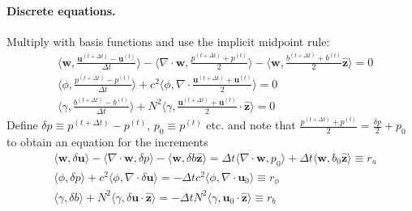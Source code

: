 \documentclass[10pt]{article}
\renewcommand{\vec}[1]{\boldsymbol{#1}}
\newcommand{\zhat}{\hat{\vec{z}}}
\newcommand{\ddtdisc}[1]{\frac{{#1}^{(t+\Delta t)}-{#1}^{(t)}}{\Delta t}}
\newcommand{\tavg}[1]{\frac{{#1}^{(t+\Delta t)}+{#1}^{(t)}}{2}}
\begin{document}
\paragraph{Discrete equations.}
Multiply with basis functions and use the implicit midpoint rule:
\begin{equation}
 \begin{aligned}
  &\langle\vec{w},\ddtdisc{\vec{u}}\rangle
  - \langle\nabla\cdot\vec{w},\tavg{p}\rangle
  - \langle\vec{w},\tavg{b}\zhat\rangle = 0\\[1ex]
  &\langle\phi,\ddtdisc{p}\rangle
  +c^2 \langle\phi,\nabla\cdot\tavg{\vec{u}}\rangle
  = 0\\[1ex]
  &\langle\gamma,\ddtdisc{b}\rangle
  + N^2\langle\gamma,\tavg{\vec{u}}\cdot\zhat\rangle
  = 0
 \end{aligned}
\end{equation}
Define $\delta p\equiv p^{(t+\Delta t)}-p^{(t)}$, $p_0\equiv p^{(t)}$ etc. and note that $\tavg{p}=\frac{\delta p}{2}+p_0$ to obtain an equation for the increments
\begin{equation}
 \begin{aligned}
  &\langle\vec{w},\delta\vec{u}\rangle
  - \langle\nabla\cdot\vec{w},\delta p\rangle
  - \langle\vec{w},\delta b\zhat\rangle
  = \Delta t \langle\nabla\cdot\vec{w},p_0\rangle
  + \Delta t \langle\vec{w},b_0\zhat\rangle
  \equiv r_u
 \\[1ex]
  &\langle\phi,\delta p\rangle
  +c^2 \langle\phi,\nabla\cdot\delta\vec{u}\rangle
  = -\Delta tc^2\langle\phi,\nabla\cdot\vec{u}_0\rangle
  \equiv r_\phi
  \\[1ex]
  &\langle\gamma,\delta b\rangle
  + N^2\langle\gamma,\delta\vec{u}\cdot\zhat\rangle
  = -\Delta t N^2\langle\gamma,\vec{u}_0\cdot\zhat\rangle
  \equiv r_b\label{eqn:Increments}
 \end{aligned}
\end{equation}
\end{document}
